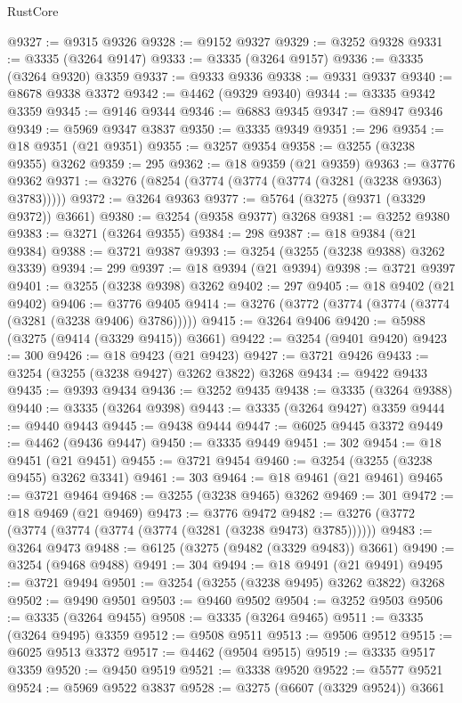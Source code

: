 \begin{lexlean}{RustCore}
\begin{coremodule}
@9327 := @9315 @9326
@9328 := @9152 @9327
@9329 := @3252 @9328
@9331 := @3335 (@3264 @9147)
@9333 := @3335 (@3264 @9157)
@9336 := @3335 (@3264 @9320) @3359
@9337 := @9333 @9336
@9338 := @9331 @9337
@9340 := @8678 @9338 @3372
@9342 := @4462 (@9329 @9340)
@9344 := @3335 @9342 @3359
@9345 := @9146 @9344
@9346 := @6883 @9345
@9347 := @8947 @9346
@9349 := @5969 @9347 @3837
@9350 := @3335 @9349
@9351 := 296
@9354 := @18 @9351 (@21 @9351)
@9355 := @3257 @9354
@9358 := @3255 (@3238 @9355) @3262
@9359 := 295
@9362 := @18 @9359 (@21 @9359)
@9363 := @3776 @9362
@9371 := @3276 (@8254 (@3774 (@3774 (@3774 (@3281 (@3238 @9363) @3783)))))
@9372 := @3264 @9363
@9377 := @5764 (@3275 (@9371 (@3329 @9372)) @3661)
@9380 := @3254 (@9358 @9377) @3268
@9381 := @3252 @9380
@9383 := @3271 (@3264 @9355)
@9384 := 298
@9387 := @18 @9384 (@21 @9384)
@9388 := @3721 @9387
@9393 := @3254 (@3255 (@3238 @9388) @3262 @3339)
@9394 := 299
@9397 := @18 @9394 (@21 @9394)
@9398 := @3721 @9397
@9401 := @3255 (@3238 @9398) @3262
@9402 := 297
@9405 := @18 @9402 (@21 @9402)
@9406 := @3776 @9405
@9414 := @3276 (@3772 (@3774 (@3774 (@3774 (@3281 (@3238 @9406) @3786)))))
@9415 := @3264 @9406
@9420 := @5988 (@3275 (@9414 (@3329 @9415)) @3661)
@9422 := @3254 (@9401 @9420)
@9423 := 300
@9426 := @18 @9423 (@21 @9423)
@9427 := @3721 @9426
@9433 := @3254 (@3255 (@3238 @9427) @3262 @3822) @3268
@9434 := @9422 @9433
@9435 := @9393 @9434
@9436 := @3252 @9435
@9438 := @3335 (@3264 @9388)
@9440 := @3335 (@3264 @9398)
@9443 := @3335 (@3264 @9427) @3359
@9444 := @9440 @9443
@9445 := @9438 @9444
@9447 := @6025 @9445 @3372
@9449 := @4462 (@9436 @9447)
@9450 := @3335 @9449
@9451 := 302
@9454 := @18 @9451 (@21 @9451)
@9455 := @3721 @9454
@9460 := @3254 (@3255 (@3238 @9455) @3262 @3341)
@9461 := 303
@9464 := @18 @9461 (@21 @9461)
@9465 := @3721 @9464
@9468 := @3255 (@3238 @9465) @3262
@9469 := 301
@9472 := @18 @9469 (@21 @9469)
@9473 := @3776 @9472
@9482 := @3276 (@3772 (@3774 (@3774 (@3774 (@3774 (@3281 (@3238 @9473) @3785))))))
@9483 := @3264 @9473
@9488 := @6125 (@3275 (@9482 (@3329 @9483)) @3661)
@9490 := @3254 (@9468 @9488)
@9491 := 304
@9494 := @18 @9491 (@21 @9491)
@9495 := @3721 @9494
@9501 := @3254 (@3255 (@3238 @9495) @3262 @3822) @3268
@9502 := @9490 @9501
@9503 := @9460 @9502
@9504 := @3252 @9503
@9506 := @3335 (@3264 @9455)
@9508 := @3335 (@3264 @9465)
@9511 := @3335 (@3264 @9495) @3359
@9512 := @9508 @9511
@9513 := @9506 @9512
@9515 := @6025 @9513 @3372
@9517 := @4462 (@9504 @9515)
@9519 := @3335 @9517 @3359
@9520 := @9450 @9519
@9521 := @3338 @9520
@9522 := @5577 @9521
@9524 := @5969 @9522 @3837
@9528 := @3275 (@6607 (@3329 @9524)) @3661

\end{coremodule}
\end{lexlean}

